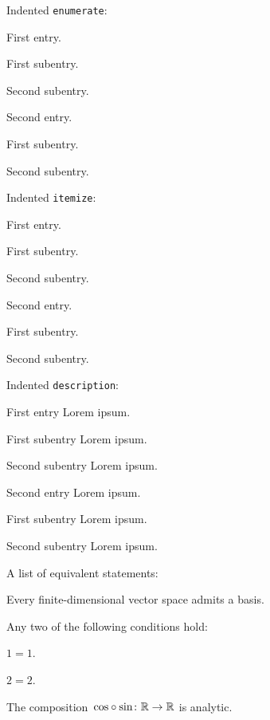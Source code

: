 \noindent
Indented \texttt{enumerate}:
\begin{enumerate*}
	\item
		First entry.
		\begin{enumerate*}
			\item
				First subentry.
			\item
				Second subentry.
		\end{enumerate*}
	\item
		Second entry.
		\begin{enumerate*}
			\item
				First subentry.
			\item
				Second subentry.
		\end{enumerate*}
\end{enumerate*}
Indented \texttt{itemize}:
\begin{itemize*}
	\item
		First entry.
		\begin{itemize*}
			\item
				First subentry.
			\item
				Second subentry.
			\end{itemize*}
	\item
		Second entry.
		\begin{itemize*}
			\item
				First subentry.
			\item
				Second subentry.
		\end{itemize*}
\end{itemize*}
Indented \texttt{description}:
\begin{description*}
	\item[First entry]
		Lorem ipsum.
		\begin{description*}
			\item[First subentry]
				Lorem ipsum.
			\item[Second subentry]
				Lorem ipsum.
		\end{description*}
	\item[Second entry]
		Lorem ipsum.
		\begin{description*}
			\item[First subentry]
				Lorem ipsum.
			\item[Second subentry]
				Lorem ipsum.
		\end{description*}
\end{description*}
A list of equivalent statements:
\begin{equivalenceslist}
	\item
		\label{every fd vs has a basis}
		Every finite-dimensional vector space admits a basis.
	\item
		\label{any two of the equalities}
		Any two of the following conditions hold:
		\begin{equivalenceslist}
			\item
				$1 = 1$.
			\item
				$2 = 2$.
		\end{equivalenceslist}
	\item
		\label{composition is analytic}
		The composition~${\cos} \circ {\sin} \colon \Real \to \Real$ is analytic.
\end{equivalenceslist}
